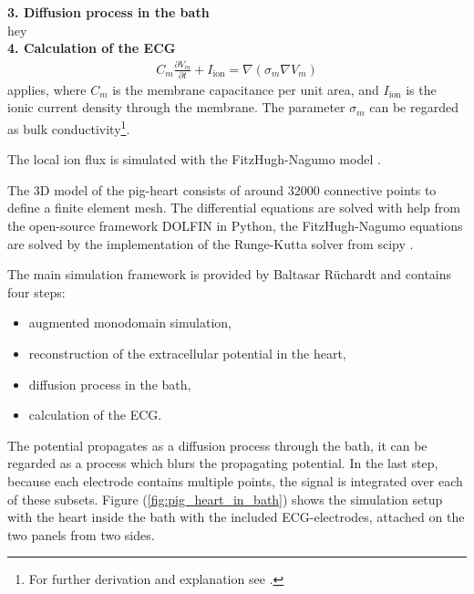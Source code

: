 \textbf{3. Diffusion process in the bath}\\
hey\\

\textbf{4. Calculation of the ECG}\\


\begin{align}
    C_m\frac{\partial V_m}{\partial t}+I_{\text{ion}}=\nabla(\sigma_m\nabla V_m)
\end{align}
applies, where $C_m$ is the membrane capacitance per unit area, and $I_\text{ion}$ is the ionic current density through the membrane. The parameter $\sigma_m$ can be regarded as bulk conductivity\footnote{For further derivation and explanation see \cite{bishop_bidomain_2011}.}.

The local ion flux is simulated with the FitzHugh-Nagumo model \cite{fitzhugh_1955}.

The 3D model of the pig-heart consists of around 32000 connective points to define a finite element mesh. The differential equations are solved with help from the open-source framework DOLFIN \cite{LoggWells2010a} in Python, the FitzHugh-Nagumo equations are solved by the implementation of the Runge-Kutta solver from scipy \cite{2020SciPy_NMeth}.

The main simulation framework is provided by Baltasar Rüchardt \cite{baltasar} and contains four steps:\\
\begin{itemize}
    \item augmented monodomain simulation,
    \item reconstruction of the extracellular potential in the heart,
    \item diffusion process in the bath,
    \item calculation of the ECG.
\end{itemize}

The potential propagates as a diffusion process through the bath, it can be regarded as a process which blurs the propagating potential. In the last step, because each electrode contains multiple points, the signal is integrated over each of these subsets. Figure (\ref{fig:pig_heart_in_bath}) shows the simulation setup with the heart inside the bath with the included ECG-electrodes, attached on the two panels from two sides.

